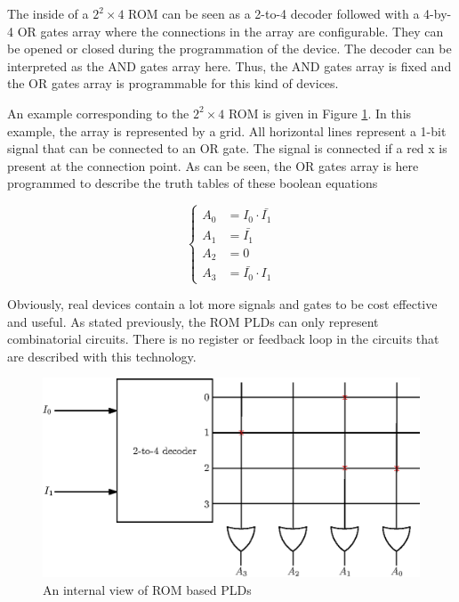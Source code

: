 The inside of a $2^2 \times 4$ ROM can be seen as a 2-to-4 decoder followed with a 4-by-4 OR gates 
array where the connections in the array are configurable. They can be opened or closed during the
programmation of the device. The decoder can be interpreted as the AND gates array here. Thus, the
AND gates array is fixed and the OR gates array is programmable for this kind of devices.

An example corresponding to the $2^2 \times 4$ ROM is given in Figure \ref{fig:fpga/pld_rom_internal}.
In this example, the array is represented by a grid. All horizontal lines represent a 1-bit signal
that can be connected to an OR gate. The signal is connected if a red x is present at the connection
point. As can be seen, the OR gates array is here programmed to describe the truth tables of these 
boolean equations

\begin{equation*}
    \begin{cases}
        A_0& = I_0 \cdot \bar{I_1} \\
        A_1& = \bar{I_1} \\
        A_2& = 0 \\
        A_3& = \bar{I_0} \cdot I_1
    \end{cases}
\end{equation*}

Obviously, real devices contain a lot more signals and gates to be cost effective and useful. 
As stated previously, the ROM PLDs can only represent combinatorial circuits. There is no register
or feedback loop in the circuits that are described with this technology.

\begin{figure}[ht]
    \centering
    \includegraphics[scale=0.8]{Chapter2-FPGA/res/pld_rom_internal}
    \caption{An internal view of ROM based PLDs}
    \label{fig:fpga/pld_rom_internal}
\end{figure}

